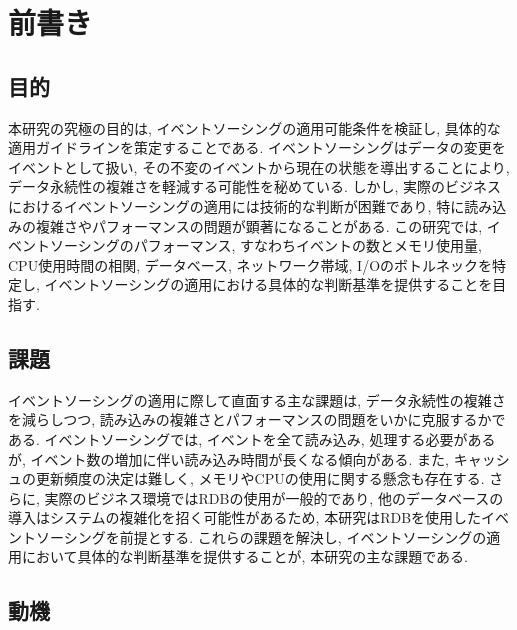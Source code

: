 \documentclass[../../main]{subfiles}
\begin{document}
    \section{前書き}\label{sec:preface}

    \subsection{目的}\label{subsec:preface-purpose}

    本研究の究極の目的は, イベントソーシングの適用可能条件を検証し, 具体的な適用ガイドラインを策定することである. イベントソーシングはデータの変更をイベントとして扱い, その不変のイベントから現在の状態を導出することにより, データ永続性の複雑さを軽減する可能性を秘めている. しかし, 実際のビジネスにおけるイベントソーシングの適用には技術的な判断が困難であり, 特に読み込みの複雑さやパフォーマンスの問題が顕著になることがある. この研究では, イベントソーシングのパフォーマンス, すなわちイベントの数とメモリ使用量, CPU使用時間の相関, データベース, ネットワーク帯域, I/Oのボトルネックを特定し, イベントソーシングの適用における具体的な判断基準を提供することを目指す.

    \subsection{課題}\label{subsec:preface-problem}

    イベントソーシングの適用に際して直面する主な課題は, データ永続性の複雑さを減らしつつ, 読み込みの複雑さとパフォーマンスの問題をいかに克服するかである. イベントソーシングでは, イベントを全て読み込み, 処理する必要があるが, イベント数の増加に伴い読み込み時間が長くなる傾向がある. また, キャッシュの更新頻度の決定は難しく, メモリやCPUの使用に関する懸念も存在する. さらに, 実際のビジネス環境ではRDBの使用が一般的であり, 他のデータベースの導入はシステムの複雑化を招く可能性があるため, 本研究はRDBを使用したイベントソーシングを前提とする. これらの課題を解決し, イベントソーシングの適用において具体的な判断基準を提供することが, 本研究の主な課題である.

    \subsection{動機}\label{subsec:preface-motive}
\end{document}
